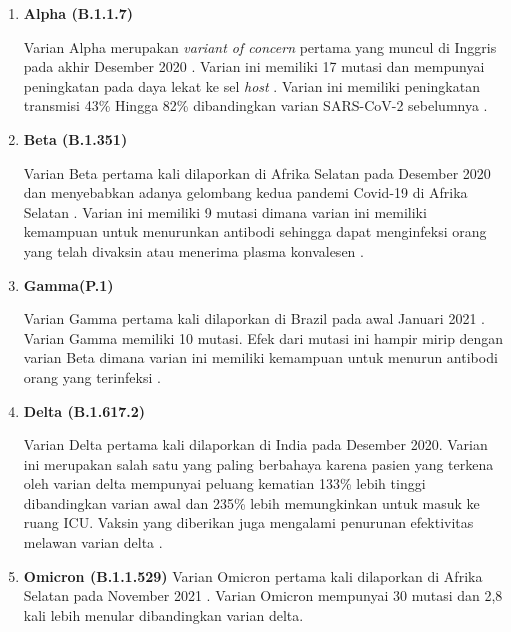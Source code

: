 \begin{enumerate}
    \item \textbf{Alpha (B.1.1.7)} 
    
    Varian Alpha merupakan \textit{variant of concern} pertama yang muncul di Inggris pada akhir Desember 2020 
    \cite{pmid33476315}. Varian ini memiliki 17 mutasi dan mempunyai peningkatan pada daya lekat ke sel 
    \textit{host} \cite{pmid33501442, pmid33658326}. Varian ini memiliki peningkatan transmisi 43\% Hingga
    82\% dibandingkan varian SARS-CoV-2 sebelumnya \cite{pmid33658326}. 

    \item \textbf{Beta (B.1.351)} 
    
    Varian Beta pertama kali dilaporkan di Afrika Selatan pada Desember 2020 dan menyebabkan adanya gelombang 
    kedua pandemi Covid-19 di Afrika Selatan \cite{pmid33690265}. Varian ini memiliki 9 mutasi \cite{pmid33630820}
    dimana varian ini memiliki kemampuan untuk menurunkan antibodi sehingga dapat menginfeksi orang yang telah
    divaksin atau menerima plasma konvalesen \cite{pmid33688656}.
    
    \item \textbf{Gamma(P.1)} 
    
    Varian Gamma pertama kali dilaporkan di Brazil pada awal Januari 2021 \cite{pmid33688664}. Varian Gamma
    memiliki 10 mutasi. Efek dari mutasi ini hampir mirip dengan varian Beta dimana varian ini memiliki kemampuan
    untuk menurun antibodi orang yang terinfeksi \cite{pmid33688656}.

    \item \textbf{Delta (B.1.617.2)}
    
    Varian Delta pertama kali dilaporkan di India pada Desember 2020. Varian ini merupakan salah satu yang paling
    berbahaya karena pasien yang terkena oleh varian delta mempunyai peluang kematian 133\% lebih tinggi dibandingkan
    varian awal dan 235\% lebih memungkinkan untuk masuk ke ruang ICU. Vaksin yang diberikan juga mengalami penurunan
    efektivitas melawan varian delta \cite{pmid34698149}.

    \item \textbf{Omicron (B.1.1.529)} 
    Varian Omicron pertama kali dilaporkan di Afrika Selatan pada November 2021 \cite{pmid34876769}. Varian 
    Omicron mempunyai 30 mutasi \cite{pmid34860154} dan 2,8 kali lebih menular dibandingkan varian delta. 

\end{enumerate}

